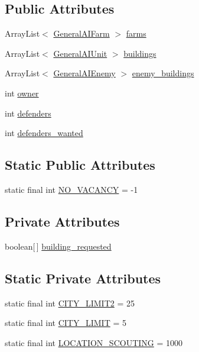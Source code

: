 \subsection*{Public Attributes}
\begin{DoxyCompactItemize}
\item 
ArrayList$<$ \hyperlink{classai_1_1general_1_1_general_a_i_farm}{GeneralAIFarm} $>$ \hyperlink{classai_1_1general_1_1_general_a_i_town_ac5bd96d862c3a343ac10ec425264bb40}{farms}
\item 
ArrayList$<$ \hyperlink{classai_1_1general_1_1_general_a_i_unit}{GeneralAIUnit} $>$ \hyperlink{classai_1_1general_1_1_general_a_i_town_adc8c7f0186a5d950e42755cef386bdef}{buildings}
\item 
ArrayList$<$ \hyperlink{classai_1_1general_1_1_general_a_i_enemy}{GeneralAIEnemy} $>$ \hyperlink{classai_1_1general_1_1_general_a_i_town_a91cd92b61de687c024e0c548de5a0c9c}{enemy\_\-buildings}
\item 
int \hyperlink{classai_1_1general_1_1_general_a_i_town_a800050c1a4d3b38e5b278ef5baa022a6}{owner}
\item 
int \hyperlink{classai_1_1general_1_1_general_a_i_town_a5a21a3abfa24a898efb8da41576de31e}{defenders}
\item 
int \hyperlink{classai_1_1general_1_1_general_a_i_town_ae48c777b4279a86050c7150a035ec2d8}{defenders\_\-wanted}
\end{DoxyCompactItemize}
\subsection*{Static Public Attributes}
\begin{DoxyCompactItemize}
\item 
static final int \hyperlink{classai_1_1general_1_1_general_a_i_town_a79df4db8ca7a4de626f676096863b114}{NO\_\-VACANCY} = -\/1
\end{DoxyCompactItemize}
\subsection*{Private Attributes}
\begin{DoxyCompactItemize}
\item 
boolean\mbox{[}$\,$\mbox{]} \hyperlink{classai_1_1general_1_1_general_a_i_town_aebbfac1a388c8f60bcbf1877d2e821f9}{building\_\-requested}
\end{DoxyCompactItemize}
\subsection*{Static Private Attributes}
\begin{DoxyCompactItemize}
\item 
static final int \hyperlink{classai_1_1general_1_1_general_a_i_town_a89768a3f505f2978a615031e26b3a936}{CITY\_\-LIMIT2} = 25
\item 
static final int \hyperlink{classai_1_1general_1_1_general_a_i_town_ac7e181c52b6489a74bb5d2e870629648}{CITY\_\-LIMIT} = 5
\item 
static final int \hyperlink{classai_1_1general_1_1_general_a_i_town_a221de0be695fa283fcfb40779e58db7b}{LOCATION\_\-SCOUTING} = 1000
\end{DoxyCompactItemize}


